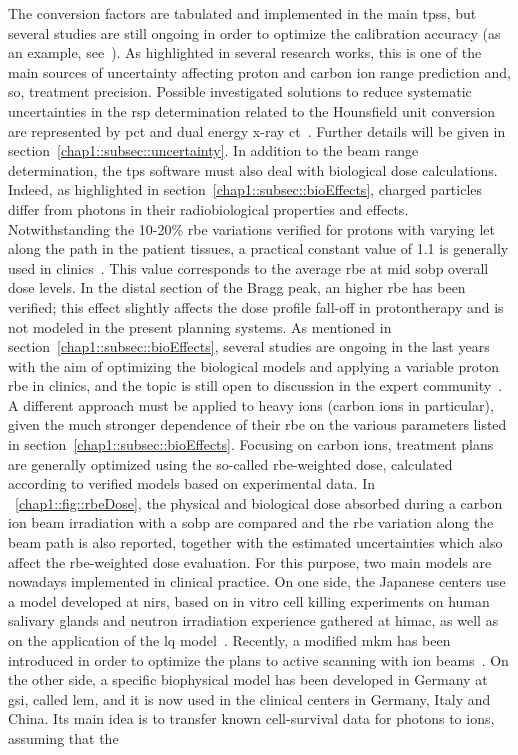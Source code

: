 The conversion factors are tabulated and implemented in the main \glspl{tps}, but several studies are still ongoing in order to optimize the calibration accuracy (as an example, see~\cite{Inaniwa2018}). As highlighted in several research works, this is one of the main sources of uncertainty affecting proton and carbon ion range prediction and, so, treatment precision. Possible investigated solutions to reduce systematic uncertainties in the \gls{rsp} determination related to the Hounsfield unit conversion are represented by \gls{pct} and dual energy x-ray \gls{ct}~\parencite{Yang2010}. Further details will be given in section~\ref{chap1::subsec::uncertainty}.
In addition to the beam range determination,  the \gls{tps} software must also deal with biological dose calculations. Indeed, as highlighted in section~\ref{chap1::subsec::bioEffects}, charged particles differ from photons in their radiobiological properties and effects. Notwithstanding the 10-20\% \gls{rbe} variations verified for protons with varying \gls{let} along the path in the patient tissues, a practical constant value of 1.1 is generally used in clinics~\parencite{Paganetti2002, ICRU2007}. This value corresponds to the average \gls{rbe} at mid \gls{sobp} overall dose levels. In the distal section of the Bragg peak, an higher \gls{rbe} has been verified; this effect slightly affects the dose profile fall-off in protontherapy and is not modeled in the present planning systems. As mentioned in section~\ref{chap1::subsec::bioEffects}, several studies are ongoing in the last years with the aim of optimizing the biological models and applying a variable proton \gls{rbe} in clinics, and the topic is still open to discussion in the expert community~\parencite{Paganetti2013, Paganetti2014, Unkelbach2018, Luhr2018, Willers2018}. A different approach must be applied to heavy ions (carbon ions in particular), given the much stronger dependence of their \gls{rbe} on the various parameters listed in section~\ref{chap1::subsec::bioEffects}. Focusing on carbon ions, treatment plans are generally optimized using the so-called \gls{rbe}-weighted dose, calculated according to verified models based on experimental data. In \figurename~\ref{chap1::fig::rbeDose}, the physical and biological dose absorbed during a carbon ion beam irradiation with a \gls{sobp} are compared and the \gls{rbe} variation along the beam path is also reported, together with the estimated uncertainties which also affect the \gls{rbe}-weighted dose evaluation. For this purpose, two main models are nowadays implemented in clinical practice. On one side, the Japanese centers use a model developed at \gls{nirs}, based on in vitro cell killing experiments on human salivary glands and neutron irradiation experience gathered at \gls{himac}, as well as on the application of the \gls{lq} model~\parencite{Matsufuji2007}. Recently, a modified \gls{mkm} has been introduced in order to optimize the plans to active scanning with ion beams~\parencite{Inaniwa2015}. On the other side, a specific biophysical model has been developed in Germany at \gls{gsi}, called \gls{lem}, and it is now used in the clinical centers in Germany, Italy and China. Its main idea is to transfer known cell-survival data for photons to ions, assuming that the 